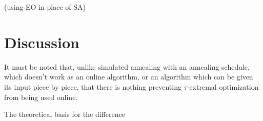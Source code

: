 \documentclass[12pt]{article}
\begin{document}
  (using EO in place of SA)






\section{Discussion}

It must be noted that, unlike simulated annealing with an annealing schedule, which doesn't work as an online algorithm, or an algorithm which can be given its input piece by piece, that there is nothing preventing $\tau$-extremal optimization from being used online.

The theoretical basis for the difference 



\end{document}
